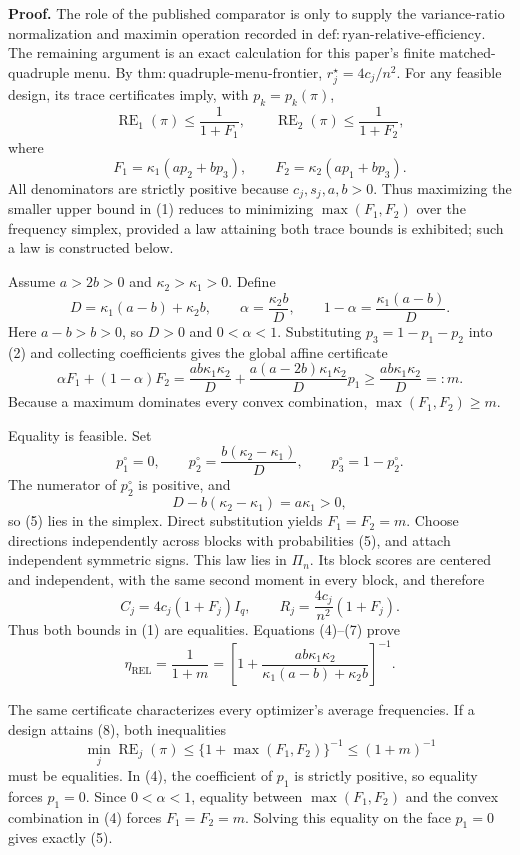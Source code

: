 \textbf{Proof.}
The role of the published comparator is only to supply the variance-ratio normalization and maximin operation recorded in \(\mathrm{def:ryan\text{-}relative\text{-}efficiency}\). The remaining argument is an exact calculation for this paper's finite matched-quadruple menu. By \(\mathrm{thm:quadruple\text{-}menu\text{-}frontier}\), \(r_j^\star=4c_j/n^2\). For any feasible design, its trace certificates imply, with \(p_k=p_k(\pi)\),
\[
\operatorname{RE}_1(\pi)\le\frac1{1+F_1},
\qquad
\operatorname{RE}_2(\pi)\le\frac1{1+F_2},
\tag{1}
\]
where
\[
F_1=\kappa_1(ap_2+bp_3),
\qquad
F_2=\kappa_2(ap_1+bp_3).
\tag{2}
\]
All denominators are strictly positive because \(c_j,s_j,a,b>0\). Thus maximizing the smaller upper bound in (1) reduces to minimizing \(\max(F_1,F_2)\) over the frequency simplex, provided a law attaining both trace bounds is exhibited; such a law is constructed below.

Assume \(a>2b>0\) and \(\kappa_2>\kappa_1>0\). Define
\[
D=\kappa_1(a-b)+\kappa_2b,
\qquad
\alpha=\frac{\kappa_2b}{D},
\qquad
1-\alpha=\frac{\kappa_1(a-b)}D.
\tag{3}
\]
Here \(a-b>b>0\), so \(D>0\) and \(0<\alpha<1\). Substituting \(p_3=1-p_1-p_2\) into (2) and collecting coefficients gives the global affine certificate
\[
\alpha F_1+(1-\alpha)F_2
=\frac{ab\kappa_1\kappa_2}{D}
+\frac{a(a-2b)\kappa_1\kappa_2}{D}p_1
\ge \frac{ab\kappa_1\kappa_2}{D}=:m.
\tag{4}
\]
Because a maximum dominates every convex combination, \(\max(F_1,F_2)\ge m\).

Equality is feasible. Set
\[
p_1^\circ=0,
\qquad
p_2^\circ=\frac{b(\kappa_2-\kappa_1)}D,
\qquad
p_3^\circ=1-p_2^\circ.
\tag{5}
\]
The numerator of \(p_2^\circ\) is positive, and
\[
D-b(\kappa_2-\kappa_1)=a\kappa_1>0,
\tag{6}
\]
so (5) lies in the simplex. Direct substitution yields \(F_1=F_2=m\). Choose directions independently across blocks with probabilities (5), and attach independent symmetric signs. This law lies in \(\Pi_n\). Its block scores are centered and independent, with the same second moment in every block, and therefore
\[
C_j=4c_j(1+F_j)I_q,
\qquad
R_j=\frac{4c_j}{n^2}(1+F_j).
\tag{7}
\]
Thus both bounds in (1) are equalities. Equations (4)--(7) prove
\[
\eta_{\mathrm{REL}}
=\frac1{1+m}
=\left[1+\frac{ab\kappa_1\kappa_2}{\kappa_1(a-b)+\kappa_2b}\right]^{-1}.
\tag{8}
\]

The same certificate characterizes every optimizer's average frequencies. If a design attains (8), both inequalities
\[
\min_j\operatorname{RE}_j(\pi)
\le\{1+\max(F_1,F_2)\}^{-1}
\le(1+m)^{-1}
\tag{9}
\]
must be equalities. In (4), the coefficient of \(p_1\) is strictly positive, so equality forces \(p_1=0\). Since \(0<\alpha<1\), equality between \(\max(F_1,F_2)\) and the convex combination in (4) forces \(F_1=F_2=m\). Solving this equality on the face \(p_1=0\) gives exactly (5).

